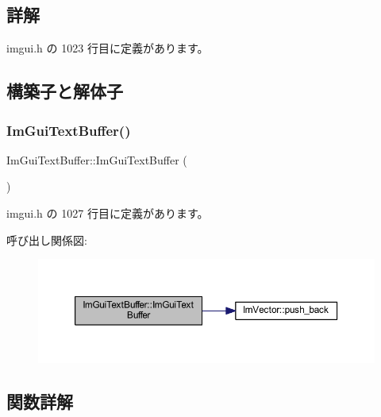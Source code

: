 \subsection{詳解}


 imgui.\+h の 1023 行目に定義があります。



\subsection{構築子と解体子}
\mbox{\label{struct_im_gui_text_buffer_a4c4369c5e65f591554428b947c498d0d}} 
\subsubsection{\texorpdfstring{Im\+Gui\+Text\+Buffer()}{ImGuiTextBuffer()}}
{\footnotesize\ttfamily Im\+Gui\+Text\+Buffer\+::\+Im\+Gui\+Text\+Buffer (\begin{DoxyParamCaption}{ }\end{DoxyParamCaption})\hspace{0.3cm}{\ttfamily [inline]}}



 imgui.\+h の 1027 行目に定義があります。

呼び出し関係図\+:\nopagebreak
\begin{figure}[H]
\begin{center}
\leavevmode
\includegraphics[width=350pt]{struct_im_gui_text_buffer_a4c4369c5e65f591554428b947c498d0d_cgraph}
\end{center}
\end{figure}


\subsection{関数詳解}
\mbox{\label{struct_im_gui_text_buffer_a791ac3e5638c58b53772e14bee1323db}} 
